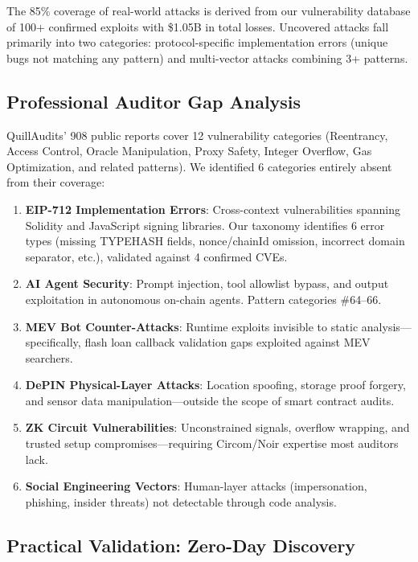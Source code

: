 \documentclass[runningheads]{llncs}
\begin{document}
The 85\% coverage of real-world attacks is derived from our vulnerability database of 100+ confirmed exploits with \$1.05B in total losses. Uncovered attacks fall primarily into two categories: protocol-specific implementation errors (unique bugs not matching any pattern) and multi-vector attacks combining 3+ patterns.

\subsection{Professional Auditor Gap Analysis}
\label{sec:gap}

QuillAudits' 908 public reports cover 12 vulnerability categories (Reentrancy, Access Control, Oracle Manipulation, Proxy Safety, Integer Overflow, Gas Optimization, and related patterns). We identified 6 categories entirely absent from their coverage:

\begin{enumerate}
\item \textbf{EIP-712 Implementation Errors}: Cross-context vulnerabilities spanning Solidity and JavaScript signing libraries. Our taxonomy identifies 6 error types (missing TYPEHASH fields, nonce/chainId omission, incorrect domain separator, etc.), validated against 4 confirmed CVEs.
\item \textbf{AI Agent Security}: Prompt injection, tool allowlist bypass, and output exploitation in autonomous on-chain agents. Pattern categories \#64--66.
\item \textbf{MEV Bot Counter-Attacks}: Runtime exploits invisible to static analysis—specifically, flash loan callback validation gaps exploited against MEV searchers.
\item \textbf{DePIN Physical-Layer Attacks}: Location spoofing, storage proof forgery, and sensor data manipulation—outside the scope of smart contract audits.
\item \textbf{ZK Circuit Vulnerabilities}: Unconstrained signals, overflow wrapping, and trusted setup compromises—requiring Circom/Noir expertise most auditors lack.
\item \textbf{Social Engineering Vectors}: Human-layer attacks (impersonation, phishing, insider threats) not detectable through code analysis.
\end{enumerate}

\subsection{Practical Validation: Zero-Day Discovery}
\end{document}
